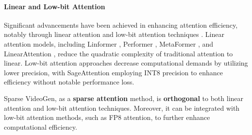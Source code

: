 \paragraph{Linear and Low-bit Attention} Significant advancements have been achieved in enhancing attention efficiency, notably through linear attention \cite{cai2023efficientvit,xie2024sana} and low-bit attention techniques \cite{zhang2025sageattention,zhang2024sageattention2}. Linear attention models, including Linformer \cite{wang2020linformer}, Performer \cite{choromanski2020rethinking}, MetaFormer \cite{yu2022metaformer}, and LinearAttention \cite{katharopoulos2020transformers}, reduce the quadratic complexity of traditional attention to linear. Low-bit attention approaches decrease computational demands by utilizing lower precision, with SageAttention \cite{zhang2025sageattention} employing INT8 precision to enhance efficiency without notable performance loss.

Sparse VideoGen, as a \textbf{sparse attention} method, is \textbf{orthogonal} to both linear attention and low-bit attention techniques. 
Moreover, it can be integrated with low-bit attention methods, such as FP8 attention, to further enhance computational efficiency. 
